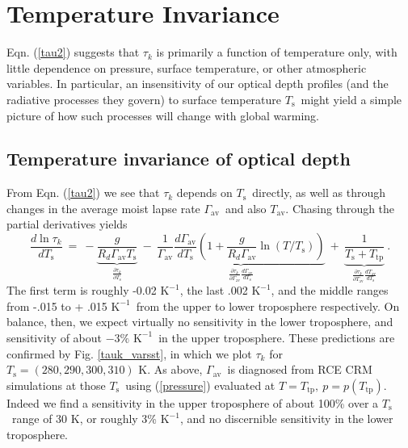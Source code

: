 \documentclass[10pt]{article}
\newcommand{\beqn}{\begin{equation}}
\newcommand{\eeqn}{\end{equation}}
\newcommand{\eqnref}[1]{(\ref{#1})}
\newcommand{\n}{\nonumber}
\newcommand{\partialderf}[2]{\ensuremath{\frac{\partial #1}{\partial #2}}}
\newcommand{\der}[2]{\ensuremath{\frac{d #1}{d #2}}}
\newcommand{\Tav}{\ensuremath{T_\mathrm{av}}}
\newcommand{\Ts}{\ensuremath{T_\mathrm{s}}}
\newcommand{\Ttp}{\ensuremath{T_\mathrm{tp}}}
\newcommand{\gammaav}{\ensuremath{\Gamma_\mathrm{av}}}
\newcommand{\Kinverse}{\ensuremath{\mathrm{K^{-1}}}}
\begin{document}
\section{Temperature Invariance}
		Eqn. \eqnref{tau2} suggests that $\tau_k$ is primarily a function of temperature only, with little dependence on pressure,  surface temperature, or other atmospheric variables. In particular, an insensitivity of our optical depth profiles (and the radiative processes they govern) to surface temperature \Ts\ might yield a simple picture of how such processes will change with global warming. 

	\subsection{Temperature invariance of optical depth}
		From Eqn. \eqnref{tau2} we see that $\tau_k$ depends on \Ts\ directly, as well as through changes in the average moist lapse rate \gammaav\ and also \Tav. Chasing through the partial derivatives yields
		\beqn
			\der{\ln \tau_k}{\Ts} \ =\ - \underbrace{\frac{g}{R_d \gammaav \Ts}}_{\textstyle{\partialderf{\tau_k}{\Ts}}} \ - \
							  \underbrace{ \frac{1}{\gammaav}\der{\gammaav}{\Ts}\left( 1 + \frac{g}{R_d \gammaav} \ln(T/\Ts) \right) }_{\textstyle{\partialderf{\tau_k}{\gammaav}\der{\gammaav}{\Ts}}} \ + \
							 \underbrace{\frac{1}{\Ts + \Ttp}}_{\textstyle{\partialderf{\tau_k}{\Tav}\der{\Tav}{\Ts}}}  \ .
		\n
		\eeqn
The first term is roughly -0.02 \Kinverse, the last .002 \Kinverse, and the middle ranges from -.015 to + .015 \Kinverse\ from the upper to lower troposphere respectively. On balance, then, we expect virtually no sensitivity in the lower troposphere, and sensitivity of about $- 3 \%$ \Kinverse\ in the upper troposphere. These predictions are confirmed by Fig. \ref{tauk_varsst}, in which we plot $\tau_k$ for $\Ts=(280,290,300,310)$ K. As above,  \gammaav\ is diagnosed from RCE CRM simulations at those \Ts\ using \eqnref{pressure} evaluated at $T=\Ttp,\ p=p(\Ttp)$. Indeed we find a sensitivity in the upper troposphere of about 100\% over a \Ts\ range of 30 K, or roughly  3\% \Kinverse, and no discernible sensitivity in the lower troposphere.
\end{document}
